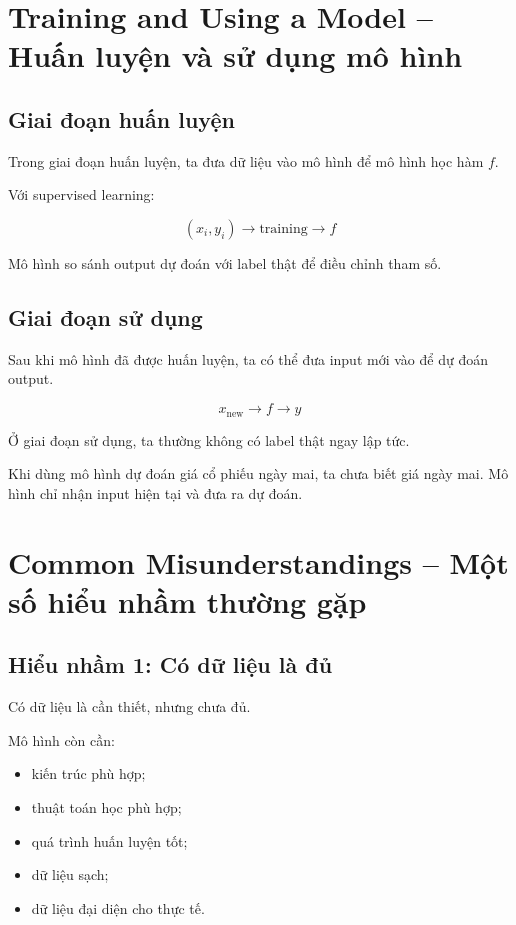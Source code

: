 \section{Training and Using a Model -- Huấn luyện và sử dụng mô hình}

\subsection{Giai đoạn huấn luyện}

Trong giai đoạn huấn luyện, ta đưa dữ liệu vào mô hình để mô hình học hàm $f$.

Với supervised learning:

\[
    (x_i,y_i)
    \rightarrow
    \text{training}
    \rightarrow
    f
\]

Mô hình so sánh output dự đoán với label thật để điều chỉnh tham số.

\subsection{Giai đoạn sử dụng}

Sau khi mô hình đã được huấn luyện, ta có thể đưa input mới vào để dự đoán output.

\[
    x_{\text{new}}
    \rightarrow
    f
    \rightarrow
    \hat{y}
\]

Ở giai đoạn sử dụng, ta thường không có label thật ngay lập tức.

\begin{vidu}
Khi dùng mô hình dự đoán giá cổ phiếu ngày mai, ta chưa biết giá ngày mai. Mô hình chỉ nhận input hiện tại và đưa ra dự đoán.
\end{vidu}

\section{Common Misunderstandings -- Một số hiểu nhầm thường gặp}

\subsection{Hiểu nhầm 1: Có dữ liệu là đủ}

Có dữ liệu là cần thiết, nhưng chưa đủ.

Mô hình còn cần:

\begin{itemize}
    \item kiến trúc phù hợp;
    \item thuật toán học phù hợp;
    \item quá trình huấn luyện tốt;
    \item dữ liệu sạch;
    \item dữ liệu đại diện cho thực tế.
\end{itemize}

